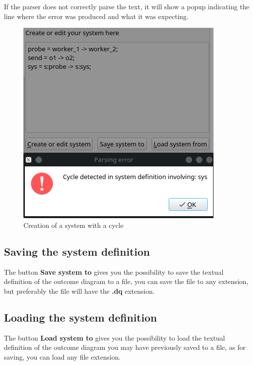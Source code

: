     If the parser does not correctly parse the text, it will show a popup indicating the line where the error was produced and what it was expecting. 
     
    \begin{figure}[H]
        \begin{center}
            \includegraphics[width = \textwidth]{img/manual/cycle.png}
        \end{center}
        \caption{Creation of a system with a cycle}
    \end{figure}


    \subsection{Saving the system definition}

    The button \textbf{Save system to} gives you the possibility to save the textual definition of the outcome diagram to a file, you can save the file to any extension, but preferably the file will have the \textbf{.dq} extension.

    \subsection{Loading the system definition}

    The button \textbf{Load system to} gives you the possibility to load the textual definition of the outcome diagram you may have previously saved to a file, as for saving, you can load any file extension.

